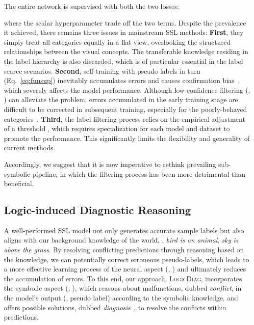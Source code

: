 \documentclass[10pt,twocolumn,letterpaper]{article}
\def\Ours{{\textsc{LogicDiag}}}
\begin{document}
The entire network is supervised with both the two losses:
\vspace{-3pt}

where the scalar hyperparameter  trade off the two terms.
Despite the prevalence it achieved, there remains three issues in mainstream SSL methods:
\textbf{First}, they simply treat all categories equally in a flat view, overlooking the structured relationships between the visual concepts. The transferable knowledge residing in the label hierarchy is also discarded, which is of particular essential in the label scarce scenarios.
\textbf{Second}, self-training with pseudo labels in turn (Eq.~\ref{eq:funsup}) inevitably accumulates errors and causes confirmation bias~\cite{arazo2020pseudo}, which severely affects the model performance.
Although low-confidence filtering (\ie, ) can alleviate the problem, errors accumulated in the early training stage are difficult to be corrected in subsequent training, especially for the poorly-behaved categories~\cite{chen2022debiased}.
\textbf{Third}, the label filtering process relies on the empirical adjustment of a threshold , which requires specialization for each model and dataset to promote the performance. This significantly limits the flexibility and generality of current methods.

Accordingly, we suggest that it is now imperative to rethink prevailing sub-symbolic pipeline, in which the filtering process  has been more detrimental than beneficial.


\vspace{6pt}
\subsection{Logic-induced Diagnostic Reasoning}\label{sec:meth:define}
\noindent A well-performed SSL model not only generates accurate sample labels but also aligns with our background knowledge of the world, \eg, \textit{bird is an animal}, \textit{sky is above the grass}.
By resolving conflicting predictions through reasoning based on the knowledge, we can potentially correct erroneous pseudo-labels, which leads to a more effective learning process of the neural aspect (\ie, ) and ultimately reduces the accumulation of errors.
To this end, our approach, {\Ours}, incorporates the symbolic aspect (\ie, ), which reasons about malfunctions, dubbed \textit{conflict}, in the model's output (\ie, pseudo label) according to the symbolic knowledge, and offers possible solutions, dubbed \textit{diagnosis}~\cite{reiter1987theory}, to resolve the conflicts within predictions. 
\end{document}
